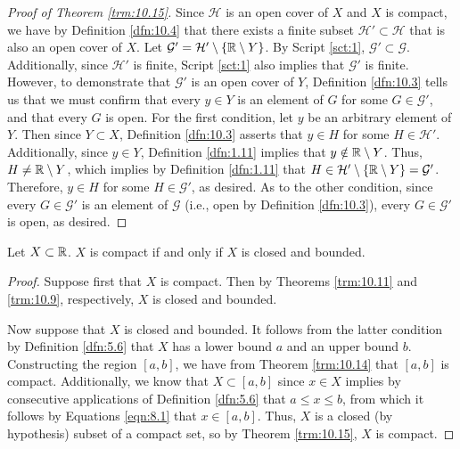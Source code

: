 \documentclass[../main.tex]{subfiles}
\begin{document}
\begin{theorem}
\begin{proof}[Proof of Theorem \ref{trm:10.15}]
        Since $\mathcal{H}$ is an open cover of $X$ and $X$ is compact, we have by Definition \ref{dfn:10.4} that there exists a finite subset $\mathcal{H}'\subset\mathcal{H}$ that is also an open cover of $X$. Let $\mathcal{G}'=\mathcal{H}'\setminus\{\mathbb{R}\setminus Y\}$. By Script \ref{sct:1}, $\mathcal{G}'\subset\mathcal{G}$. Additionally, since $\mathcal{H}'$ is finite, Script \ref{sct:1} also implies that $\mathcal{G}'$ is finite. However, to demonstrate that $\mathcal{G}'$ is an open cover of $Y$, Definition \ref{dfn:10.3} tells us that we must confirm that every $y\in Y$ is an element of $G$ for some $G\in\mathcal{G}'$, and that every $G$ is open. For the first condition, let $y$ be an arbitrary element of $Y$. Then since $Y\subset X$, Definition \ref{dfn:10.3} asserts that $y\in H$ for some $H\in\mathcal{H}'$. Additionally, since $y\in Y$, Definition \ref{dfn:1.11} implies that $y\notin\mathbb{R}\setminus Y$. Thus, $H\neq\mathbb{R}\setminus Y$, which implies by Definition \ref{dfn:1.11} that $H\in\mathcal{H}'\setminus\{\mathbb{R}\setminus Y\}=\mathcal{G}'$. Therefore, $y\in H$ for some $H\in\mathcal{G}'$, as desired. As to the other condition, since every $G\in\mathcal{G}'$ is an element of $\mathcal{G}$ (i.e., open by Definition \ref{dfn:10.3}), every $G\in\mathcal{G}'$ is open, as desired.
    \end{proof}
\end{theorem}

\begin{theorem}\label{trm:10.16}
    Let $X\subset\mathbb{R}$. $X$ is compact if and only if $X$ is closed and bounded.
    \begin{proof}
        Suppose first that $X$ is compact. Then by Theorems \ref{trm:10.11} and \ref{trm:10.9}, respectively, $X$ is closed and bounded.\par
        Now suppose that $X$ is closed and bounded. It follows from the latter condition by Definition \ref{dfn:5.6} that $X$ has a lower bound $a$ and an upper bound $b$. Constructing the region $[a,b]$, we have from Theorem \ref{trm:10.14} that $[a,b]$ is compact. Additionally, we know that $X\subset[a,b]$ since $x\in X$ implies by consecutive applications of Definition \ref{dfn:5.6} that $a\leq x\leq b$, from which it follows by Equations \ref{eqn:8.1} that $x\in[a,b]$. Thus, $X$ is a closed (by hypothesis) subset of a compact set, so by Theorem \ref{trm:10.15}, $X$ is compact.
    \end{proof}
\end{theorem}
\pagebreak
\end{document}
